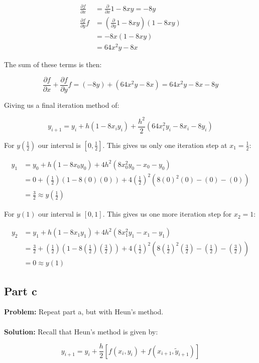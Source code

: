 \documentclass{article}
\begin{document}
\begin{align*}
  \frac{\partial f}{\partial x}&=\frac{\partial}{\partial x}1-8xy=-8y\\
  \frac{\partial f}{\partial y}f&=\left(\frac{\partial}{\partial y}1-8xy\right)(1-8xy)\\
  &=-8x(1-8xy)\\
  &=64x^2y-8x
\end{align*}

The sum of these terms is then:

$$\frac{\partial f}{\partial x}+\frac{\partial f}{\partial y}f=(-8y)+(64x^2y-8x)=64x^2y-8x-8y$$

Giving us a final iteration method of:

$$y_{i+1}=y_i+h(1-8x_iy_i)+\frac{h^2}{2}(64x_i^2y_i-8x_i-8y_i)$$


For $y\left(\frac{1}{2}\right)$ our interval is $[0,\frac{1}{2}]$. This gives us only one iteration step at $x_1=\frac{1}{2}$:

\begin{align*}
y_1&=y_0+h(1-8x_0y_0)+4h^2(8x_0^2y_0-x_0-y_0)\\
&=0+\left(\frac{1}{2}\right)(1-8(0)(0))+4\left(\frac{1}{2}\right)^2(8(0)^2(0)-(0)-(0))\\
&=\boxed{\frac{3}{2}\approx y\left(\frac{1}{2}\right)}
\end{align*}

For $y(1)$ our interval is $[0,1]$. This gives us one more iteration step for $x_2=1$:

\begin{align*}
  y_2&=y_1+h(1-8x_1y_1)+4h^2(8x_1^2y_1-x_1-y_1)\\
  &=\frac{3}{2}+\left(\frac{1}{2}\right)\left(1-8\left(\frac{1}{2}\right)\left(\frac{3}{2}\right)\right)+4\left(\frac{1}{2}\right)^2\left(8\left(\frac{1}{2}\right)^2\left(\frac{3}{2}\right)-\left(\frac{1}{2}\right)-\left(\frac{3}{2}\right)\right)\\
  &=\boxed{0\approx y(1)}
\end{align*}

\subsection*{Part c}
\textbf{Problem:} Repeat part a, but with Heun's method.
\\\\
\textbf{Solution:} Recall that Heun's method is given by:

$$y_{i+1}=y_i+\frac{h}{2}[f(x_i,y_i)+f(x_{i+1},\tilde y_{i+1})]$$
\end{document}

